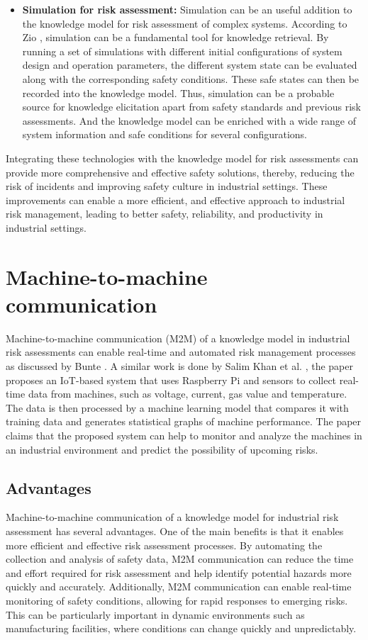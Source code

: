\begin{itemize}
    \item \textbf{Simulation for risk assessment:} Simulation can be an useful addition to the knowledge model for risk assessment of complex systems. According to Zio \cite{ZIO2018176}, simulation can be a fundamental tool for knowledge retrieval. By running a set of simulations with different initial configurations of system design and operation parameters, the different system state can be evaluated along with the corresponding safety conditions. These safe states can then be recorded into the knowledge model. Thus, simulation can be a probable source for knowledge elicitation apart from safety standards and previous risk assessments. And the knowledge model can be enriched with a wide range of system information and safe conditions for several configurations.
\end{itemize}

Integrating these technologies with the knowledge model for risk assessments can provide more comprehensive and effective safety solutions, thereby, reducing the risk of incidents and improving safety culture in industrial settings. These improvements can enable a more efficient, and effective approach to industrial risk management, leading to better safety, reliability, and productivity in industrial settings. 

\section{Machine-to-machine communication} \label{m2m}
Machine-to-machine communication (M2M) of a knowledge model in industrial risk assessments can enable real-time and automated risk management processes as discussed by Bunte \cite{Bunte2020}. A similar work is done by Salim Khan et al. \cite{Khan2022}, the paper proposes an IoT-based system that uses Raspberry Pi and sensors to collect real-time data from machines, such as voltage, current, gas value and temperature. The data is then processed by a machine learning model that compares it with training data and generates statistical graphs of machine performance. The paper claims that the proposed system can help to monitor and analyze the machines in an industrial environment and predict the possibility of upcoming risks. 

\subsection{Advantages} 
Machine-to-machine communication of a knowledge model for industrial risk assessment has several advantages. One of the main benefits is that it enables more efficient and effective risk assessment processes. By automating the collection and analysis of safety data, M2M communication can reduce the time and effort required for risk assessment and help identify potential hazards more quickly and accurately. Additionally, M2M communication can enable real-time monitoring of safety conditions, allowing for rapid responses to emerging risks. This can be particularly important in dynamic environments such as manufacturing facilities, where conditions can change quickly and unpredictably.

